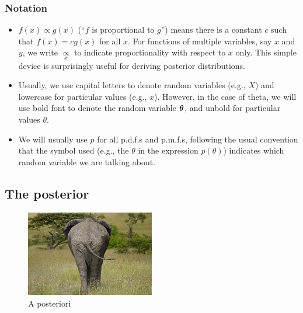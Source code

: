 \documentclass[12pt]{article}
\begin{document}
\subsubsection*{Notation}
\begin{itemize}
\item $f(x)\propto g(x)$ (``$f$ is proportional to $g$'') means there is a constant $c$ such that $f(x) = c g(x)$ for all $x$. For functions of multiple variables, say $x$ and $y$, we write $\underset{x}{\propto}$ to indicate proportionality with respect to $x$ only. This simple device is surprisingly useful for deriving posterior distributions.
\item Usually, we use capital letters to denote random variables (e.g., $X$) and lowercase for particular values (e.g., $x$). However, in the case of theta, we will use bold font to denote the random variable ${\bm\theta}$, and unbold for particular values $\theta$.
\item We will usually use $p$ for all p.d.f.s and p.m.f.s, following the usual convention that the symbol used (e.g., the $\theta$ in the expression $p(\theta)$) indicates which random variable we are talking about.
\end{itemize}


\subsection{The posterior}

\begin{figure}
  \begin{center}
    \includegraphics[width=0.5\textwidth]{elephant-posterior.jpg}
  \end{center}
  \caption*{A posteriori}
\end{figure}
\end{document}
